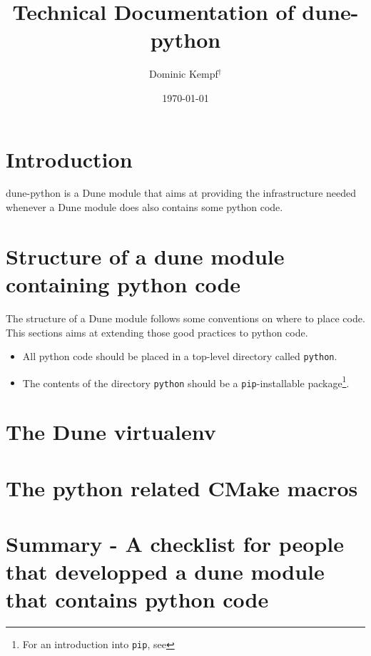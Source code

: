 \documentclass[11pt]{article}
\title{Technical Documentation of \textbf{dune-python}}
\author{
Dominic Kempf$^\dagger$
}
\date{\today}
\begin{document}
\maketitle
\tableofcontents
\pagebreak

\section{Introduction}
dune-python is a Dune module that aims at providing the infrastructure needed whenever a Dune module does also contains some python code.

\section{Structure of a dune module containing python code}
The structure of a Dune module follows some conventions on where to place code. This sections aims at extending those good practices to python code. \\

\begin{itemize}
 \item All python code should be placed in a top-level directory called \lstinline!python!.
 \item The contents of the directory \lstinline!python! should be a \lstinline!pip!-installable package\footnote{For an introduction into \lstinline!pip!, see }.
\end{itemize}

\section{The Dune virtualenv}

\section{The python related CMake macros}

\section{Summary - A checklist for people that developped a dune module that contains python code}
\end{document}
